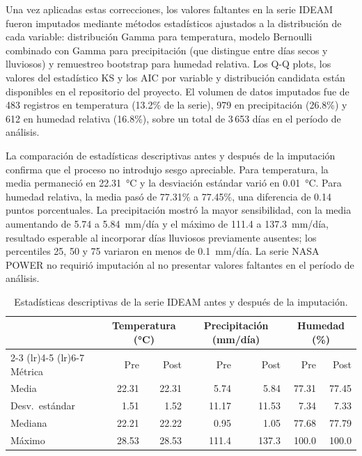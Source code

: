 \documentclass[12pt, a4paper]{article}
\begin{document}
Una vez aplicadas estas correcciones, los valores faltantes en la serie IDEAM fueron
imputados mediante métodos estadísticos ajustados a la distribución de cada variable:
distribución Gamma para temperatura, modelo Bernoulli combinado con Gamma para
precipitación (que distingue entre días secos y lluviosos) y remuestreo bootstrap
para humedad relativa. Los Q-Q plots, los valores del estadístico KS y
los AIC por variable y distribución candidata están disponibles en el repositorio
del proyecto. El volumen de datos imputados fue de 483 registros en
temperatura (13.2\% de la serie), 979 en precipitación (26.8\%) y 612 en humedad
relativa (16.8\%), sobre un total de 3\,653 días en el período de análisis.

La comparación de estadísticas descriptivas antes y después de la imputación confirma
que el proceso no introdujo sesgo apreciable. Para temperatura, la media permaneció
en 22.31~°C y la desviación estándar varió en 0.01~°C. Para humedad relativa,
la media pasó de 77.31\% a 77.45\%, una diferencia de 0.14 puntos porcentuales. La
precipitación mostró la mayor sensibilidad, con la media aumentando de 5.74 a
5.84~mm/día y el máximo de 111.4 a 137.3~mm/día, resultado esperable al incorporar
días lluviosos previamente ausentes; los percentiles 25, 50 y 75 variaron en menos
de 0.1~mm/día. La serie NASA POWER no requirió imputación al no presentar valores
faltantes en el período de análisis.

\begin{table}[h]
	\centering
	\caption{Estadísticas descriptivas de la serie IDEAM antes y después de la imputación.}
	\label{tab:imputation}
	\begin{tabular}{lrrrrrr}
		\toprule
		& \multicolumn{2}{c}{Temperatura (°C)} & \multicolumn{2}{c}{Precipitación (mm/día)} & \multicolumn{2}{c}{Humedad (\%)} \\
		\cmidrule(lr){2-3} \cmidrule(lr){4-5} \cmidrule(lr){6-7}
		Métrica & Pre & Post & Pre & Post & Pre & Post \\
		\midrule
		Media  & 22.31 &  22.31 &  5.74 &  5.84 & 77.31 & 77.45 \\
		Desv.\ estándar &  1.51 &   1.52 & 11.17 & 11.53 &  7.34 &  7.33 \\
		Mediana & 22.21 &  22.22 &  0.95 &  1.05 & 77.68 & 77.79 \\
		Máximo & 28.53 &  28.53 & 111.4 & 137.3 & 100.0 & 100.0 \\
		\bottomrule
	\end{tabular}
\end{table}
\end{document}
